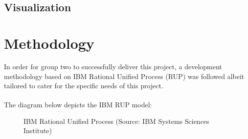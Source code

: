 \documentclass[12pt]{article} %
\begin{document}
	
	
	
	
	
	
	
	\subsection{Visualization}
	

	
	
	\section{Methodology}
	
	
	In order for group two to successfully deliver this project, a development methodology based on IBM Rational Unified Process (RUP) was followed albeit tailored to cater for the specific needs of this project.\\
	\\
	The diagram below depicts the IBM RUP model:
	
		\begin{figure}[H] %
			\caption{IBM Rational Unified Process (Source: IBM Systems Sciences Institute)}
			\label{fig:speciation}
		\end{figure}
		
\end{document}
